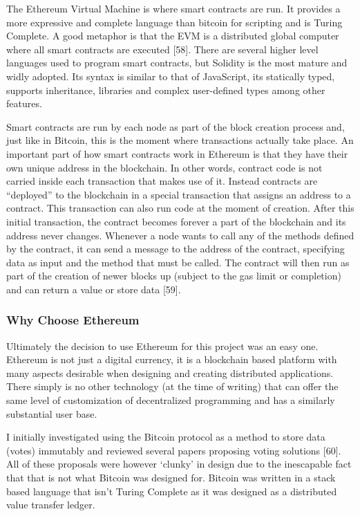 \documentclass{article}
\begin{document}
The Ethereum Virtual Machine is where smart contracts are run. It provides a more expressive and complete language than bitcoin for scripting and is Turing Complete. A good metaphor is that the EVM is a distributed global computer where all smart contracts are executed {\Large [58]}. There are several higher level languages used to program smart contracts, but Solidity is the most mature and widly adopted. Its syntax is similar to that of JavaScript, its statically typed, supports inheritance, libraries and complex user-defined types among other features.

Smart contracts are run by each node as part of the block creation process and, just like in Bitcoin, this is the moment where transactions actually take place. An important part of how smart contracts work in Ethereum is that they have their own unique address in the blockchain. In other words, contract code is not carried inside each transaction that makes use of it. Instead contracts are ``deployed'' to the blockchain in a special transaction that assigns an address to a contract. This transaction can also run code at the moment of creation. After this initial transaction, the contract becomes forever a part of the blockchain and its address never changes. Whenever a node wants to call any of the methods defined by the contract, it can send a message to the address of the contract, specifying data as input and the method that must be called. The contract will then run as part of the creation of newer blocks up (subject to the gas limit or completion) and can return a value or store data {\Large [59]}.

\cleardoublepage
\subsubsection{Why Choose Ethereum}
Ultimately the decision to use Ethereum for this project was an easy one. Ethereum is not just a digital currency, it is a blockchain based platform with many aspects desirable when designing and creating distributed applications. There simply is no other technology (at the time of writing) that can offer the same level of customization of decentralized programming and has a similarly substantial user base.

I initially investigated using the Bitcoin protocol as a method to store data (votes) immutably and reviewed several papers proposing voting solutions {\Large [60]}. All of these proposals were however `clunky' in design due to the inescapable fact that that is not what Bitcoin was designed for. Bitcoin was written in a stack based language that isn't Turing Complete as it was designed as a distributed value transfer ledger. 
\end{document}
